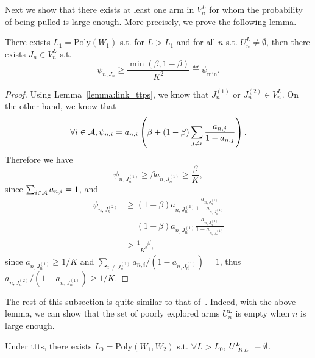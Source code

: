 Next we show that there exists at least one arm in $V_n^L$ for whom the probability of being pulled is large enough. More precisely, we prove the following lemma.

\begin{lemma}\label{lemma:psi_min_ttts}
    There exists $L_1 = \text{Poly}(W_1)$ s.t. for $L > L_1$ and for all $n$ s.t. $U_n^L \neq \emptyset$, then there exists $J_n \in V_n^L$ s.t.
    \[
        \psi_{n,J_n} \geq \frac{\min(\beta,1-\beta)}{K^2} \eqdef \psi_{\min}.
    \]
\end{lemma}

\begin{proof}
    Using Lemma~\ref{lemma:link_ttps}, we know that $J_n^{(1)}$ or $J_n^{(2)} \in V_n^L$. On the other hand, we know that
    \[
        \forall i\in\mathcal{A}, \psi_{n,i} = a_{n,i} \left(\beta + (1-\beta) \sum_{j\neq i} \frac{a_{n,j}}{1-a_{n,j}}\right).
    \]
    Therefore we have
    \[
        \psi_{n,J_n^{(1)}} \geq \beta a_{n,J_n^{(1)}} \geq \frac{\beta}{K},
    \]
    since $\sum_{i\in\mathcal{A}} a_{n,i} = 1$, and
    \begin{align*}
        \psi_{n,J_n^{(2)}} &\geq (1-\beta) a_{n,J_n^{(2)}} \frac{a_{n,J_n^{(1)}}}{1-a_{n,J_n^{(1)}}}\\
                           &= (1-\beta) a_{n,J_n^{(1)}} \frac{a_{n,J_n^{(2)}}}{1-a_{n,J_n^{(1)}}}\\
                           &\geq \frac{1-\beta}{K^2},
    \end{align*}
    since $a_{n,J_n^{(1)}} \geq 1/K$ and $\sum_{i\neq J_n^{(1)}} a_{n,i}/(1-a_{n,J_n^{(1)}}) = 1 $, thus $a_{n,J_n^{(2)}}/(1-a_{n,J_n^{(1)}}) \geq 1/K$.
\end{proof}

The rest of this subsection is quite similar to that of~\cite{qin2017ttei}. Indeed, with the above lemma, we can show that the set of poorly explored arms $U_n^L$ is empty when $n$ is large enough.

\begin{lemma}\label{lemma:poorly_explored_ttts}
    Under \gls{ttts}, there exists $L_0 = \text{Poly}(W_1,W_2)$ s.t. $\forall L > L_0$, $U_{\lfloor KL\rfloor}^L = \emptyset$.
\end{lemma}

